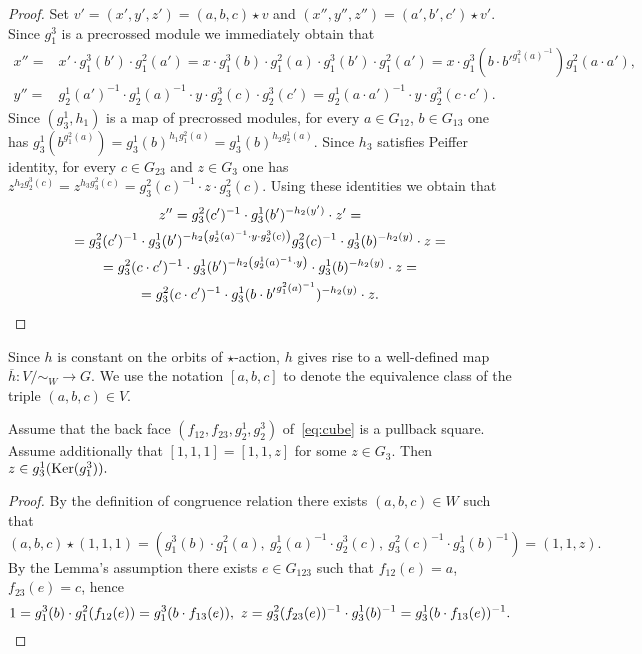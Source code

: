 \begin{proof}
    Set $v'=(x', y', z') = (a, b, c) \star v$ and $(x'', y'', z'') = (a', b', c') \star v'$.
    Since $g_1^3$ is a precrossed module we immediately obtain that
    \begin{align*}
        x'' =& x' \cdot g_1^3(b') \cdot g_1^2(a') = x \cdot g_1^3(b) \cdot g_1^2(a) \cdot g_1^3(b') \cdot g_1^2(a') = x \cdot g_1^3(b \cdot b'^{g_1^2(a)^{-1}}) g_1^2(a \cdot a'),\\
        y'' =& g_2^1(a')^{-1} \cdot g_2^1(a)^{-1} \cdot y \cdot g_2^3(c) \cdot g_2^3(c') = g_2^1(a\cdot a')^{-1} \cdot y \cdot g_2^{3}(c\cdot c'). \end{align*}
    Since $(g_3^1, h_1)$ is a map of precrossed modules, for every $a \in G_{12}$, $b \in G_{13}$ one has $g_3^1(b^{g_1^2(a)}) = g_3^1(b)^{h_1 g_1^2(a)} = g_3^1(b)^{h_2g_2^1(a)}$.
    Since $h_3$ satisfies Peiffer identity, for every $c \in G_{23}$ and $z \in G_3$ one has $z ^{h_2 g_2^3(c)} = z^{ h_3 g_3^2(c)} = g_3^2(c)^{-1} \cdot z \cdot g_3^2(c)$.
    Using these identities we obtain that
    \begin{multline*}
        z'' = g_3^2(c')^{-1} \cdot g_3^1(b')^{-h_2(y')} \cdot z' = \\
        = g_3^2(c')^{-1} \cdot g_3^1(b')^{- h_2 \left( g_2^1(a)^{-1} \cdot y \cdot g_2^3(c) \right)} g_3^2(c)^{-1} \cdot g_3^1(b)^{-h_2(y)} \cdot z = \\
        = g_3^2(c \cdot c')^{-1} \cdot g_3^1(b')^{- h_2 \left( g_2^1(a)^{-1} \cdot y \right)} \cdot g_3^1(b)^{-h_2(y)} \cdot z = \\
        = g_3^2(c \cdot c')^{-1} \cdot g_3^1(b \cdot {b'} ^ {g_1^2(a)^{-1}})^{- h_2 \left( y \right)} \cdot z. \qedhere
    \end{multline*}
\end{proof}
Since $h$ is constant on the orbits of $\star$-action, $h$ gives rise to a well-defined map $\overline{h} \colon V/\sim_W \to G$.
We use the notation $[a, b, c]$ to denote the equivalence class of the triple $(a, b, c) \in V$.

\begin{lemma}\label{lem:one-one-z} Assume that the back face $(f_{12}, f_{23}, g_2^1, g_2^3)$ of~\eqref{eq:cube} is a pullback square.
Assume additionally that $[1, 1, 1] = [1, 1, z]$ for some $z\in G_3$.
Then $z \in g_3^1(\operatorname{Ker}(g_1^3)).$ \end{lemma}
\begin{proof} By the definition of congruence relation there exists $(a, b, c)\in W$ such that
\[ (a, b, c) \star (1, 1, 1) = ( g_1^3(b) \cdot g_1^2(a),\ g_2^1(a)^{-1} \cdot g_2^3(c),\ g_3^2(c)^{-1} \cdot g_3^1(b)^{-1}) = (1,1,z). \]
By the Lemma's assumption there exists $e \in G_{123}$ such that $f_{12}(e) = a$, $f_{23}(e) = c$, hence
\[ 1 = g_1^3(b) \cdot g_1^2(f_{12}(e)) = g_1^3(b \cdot f_{13}(e)),\ z = g_3^2(f_{23}(e))^{-1} \cdot g_3^1(b)^{-1} = g_3^1(b \cdot f_{13}(e))^{-1}. \qedhere\] \end{proof}

